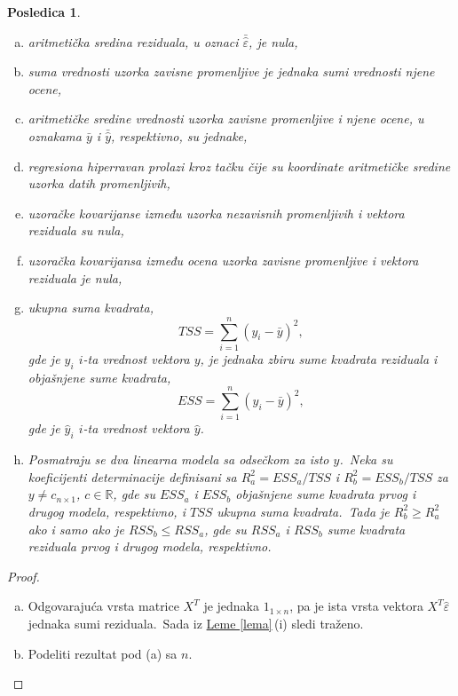 \documentclass[12pt,a4paper,titlepage,oneside]{article}
\numberwithin{equation}{section}
\numberwithin{figure}{section}
\numberwithin{table}{section}
\newtheorem{posl}[thm]{Posledica}
\theoremstyle{definition}
\theoremstyle{remark}
\begin{document}
\begin{appendices}
\begin{posl}
\begin{enumerate}[(a)]
		\item aritmetička sredina reziduala, u oznaci $\bar{\hat{\varepsilon}}$, je nula,
		
		\item suma vrednosti uzorka zavisne promenljive je jednaka sumi vrednosti njene ocene,
		
		\item aritmetičke sredine vrednosti uzorka zavisne promenljive i njene ocene, u oznakama $\bar{y}$ i $\bar{\hat{y}}$, respektivno, su jednake,
		
		\item regresiona hiperravan prolazi kroz tačku čije su koordinate aritmetičke sredine uzorka datih promenljivih,
		
		\item uzoračke kovarijanse između uzorka nezavisnih promenljivih i vektora reziduala su nula,
		
		\item uzoračka kovarijansa između ocena uzorka zavisne promenljive i vektora reziduala je nula,
		
		\item ukupna suma kvadrata, \[TSS = \sum\limits_{i = 1}^{n} (y_i - \bar{y})^2 ,\] gde je $y_i$ $i$-ta vrednost vektora $y$, je jednaka zbiru sume kvadrata reziduala i objašnjene sume kvadrata, \[ESS = \sum\limits_{i = 1}^{n} (\hat{y}_i - \bar{y})^2 ,\] gde je $\hat{y}_i$ $i$-ta vrednost vektora $\hat{y}$.
		
		\item Posmatraju se dva linearna modela sa odsečkom za isto $y$.\ Neka su koeficijenti determinacije definisani sa $R^2_a = ESS_a/TSS$ i $R^2_b = ESS_b /TSS$ za $y\neq c_{n\times 1}$, $c\in \mathbb{R}$, gde su $ESS_a$ i $ESS_b$ objašnjene sume kvadrata prvog i drugog modela, respektivno, i $TSS$ ukupna suma kvadrata.\ Tada je $R^2_b \geqslant R^2_a$ ako i samo ako je $RSS_b \leqslant RSS_a$, gde su $RSS_a$ i $RSS_b$ sume kvadrata reziduala prvog i drugog modela, respektivno.
	\end{enumerate}
\end{posl}

\begin{proof}
	\begin{enumerate}[(a)]
		\item Odgovarajuća vrsta matrice $X^T$ je jednaka $1_{1\times n}$, pa je ista vrsta vektora $X^T \hat{\varepsilon}$ jednaka sumi reziduala.\ Sada iz \hyperref[lema]{Leme \ref*{lema}}\,(i) sledi traženo.
		
		\item Podeliti rezultat pod (a) sa $n$.
		

\end{enumerate}
\end{proof}
\end{appendices}
\end{document}
